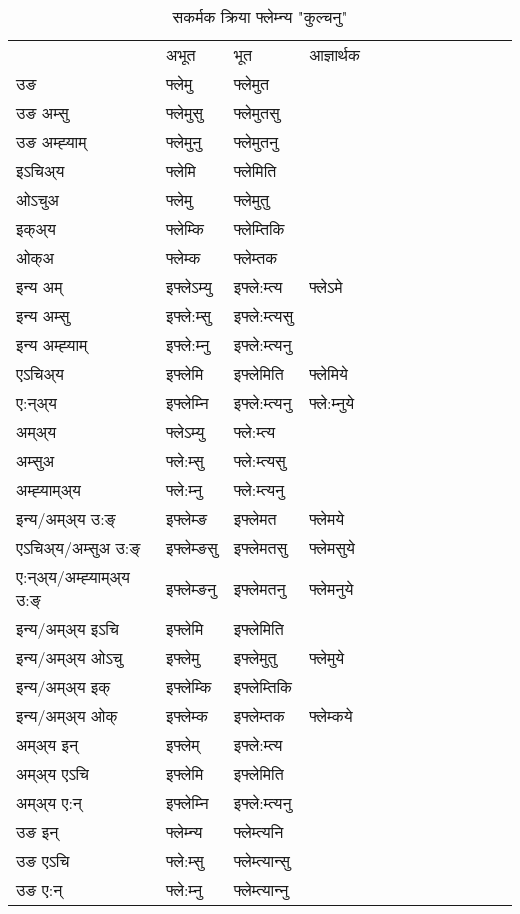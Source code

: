 \begin{table}[H]
\label{em.vt} \centering
\caption{सकर्मक क्रिया  फ्लेम्‍न्य  "कुल्चनु"  }
\begin{tabular}{l|l|l|l|l|l|l|l|l|l|l|l|l}  \toprule
&अभूत & भूत & आज्ञार्थक \\ 
उङ &फ्लेमु &फ्लेमुत \\ 
उङ अम्सु &फ्लेमुसु &फ्लेमुतसु \\ 
उङ अम्ह्‍याम् &फ्लेमुनु &फ्लेमुतनु \\ 
इऽचिअ्य &फ्लेमि &फ्लेमिति   \\ 
ओऽचुअ &फ्लेमु &फ्लेमुतु   \\ 
इक्अ्य &फ्लेम्कि &फ्लेम्तिकि   \\ 
ओक्अ &फ्लेम्क &फ्लेम्तक   \\ 
इन्य अम् & इफ्लेऽम्यु  & इफ्ले:म्त्य &फ्लेऽमे  \\ 
इन्य अम्सु & इफ्ले:म्सु  & इफ्ले:म्त्यसु   \\ 
इन्य अम्ह्‍याम् & इफ्ले:म्‍नु  & इफ्ले:म्त्यनु   \\ 
एऽचिअ्य & इफ्लेमि & इफ्लेमिति &फ्लेमिये    \\ 
ए:न्अ्य & इफ्लेम्‍नि  & इफ्ले:म्त्यनु &फ्ले:म्‍नुये  \\ 
अम्अ्य & फ्लेऽम्यु  & फ्ले:म्त्य  \\ 
अम्सुअ & फ्ले:म्सु & फ्ले:म्त्यसु  \\ 
अम्ह्‍याम्अ्य & फ्ले:म्‍नु  & फ्ले:म्त्यनु \\ 
\midrule
इन्य/अम्अ्य उ:ङ्‌&इफ्लेम्ङ & इफ्लेमत &फ्लेमये \\ 
एऽचिअ्य/अम्सुअ उ:ङ्‌ &इफ्लेम्ङसु & इफ्लेमतसु &फ्लेमसुये \\ 
ए:न्अ्य/अम्ह्‍याम्अ्य उ:ङ्‌ &इफ्लेम्ङनु & इफ्लेमतनु &फ्लेमनुये \\ 
इन्य/अम्अ्य इऽचि & इफ्लेमि & इफ्लेमिति    \\ 
इन्य/अम्अ्य ओऽचु & इफ्लेमु & इफ्लेमुतु  &फ्लेमुये  \\ 
इन्य/अम्अ्य इक् & इफ्लेम्कि & इफ्लेम्तिकि   \\ 
इन्य/अम्अ्य ओक् & इफ्लेम्क & इफ्लेम्तक  &फ्लेम्कये  \\ 
अम्अ्य इन् & इफ्लेम् & इफ्ले:म्त्य   \\ 
अम्अ्य एऽचि & इफ्लेमि & इफ्लेमिति    \\ 
अम्अ्य ए:न् & इफ्लेम्‍नि  & इफ्ले:म्त्यनु  \\ 
\midrule
उङ इन् & फ्लेम्‍न्य  & फ्लेम्त्यनि  \\ 
उङ एऽचि & फ्ले:म्सु  & फ्लेम्त्यान्सु   \\ 
उङ ए:न्& फ्ले:म्‍नु  & फ्लेम्त्यान्‍नु   \\ 
\bottomrule
\end{tabular}
\end{table}


